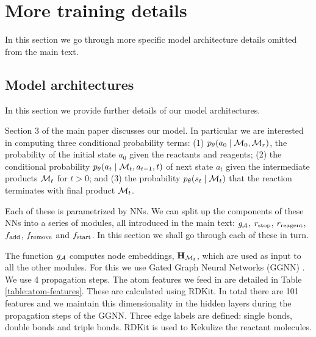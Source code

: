 \section{More training details}

In this section we go through more specific model architecture details omitted from the main text. 

\subsection{Model architectures}
In this section we provide further details of our model architectures.

Section 3 of the main paper discusses our model.
In particular we are interested in computing three conditional probability terms: (1) $p_\theta(a_0 \mid {\mathcal{M}}_0, {\mathcal{M}}_r)$, the probability of the initial state $a_0$ given the reactants and reagents; 
(2) the conditional probability $p_\theta(a_t \mid {\mathcal{M}}_t, a_{t-1}, t)$  
of next state $a_t$ given the intermediate products ${\mathcal{M}}_t$ for $t > 0$;
and (3) the probability $p_\theta(s_t \mid {\mathcal{M}}_t)$ that the reaction terminates with final product ${\mathcal{M}}_{t}$.

Each of these is parametrized by NNs. We can split up the components of these NNs into a series of modules, all introduced in the main text: $g_{{\mathcal{A}}}$, $r_{\textrm{stop}}$, $r_\mathrm{reagent}$, $f_{\textrm{add}}$, $f_{\textrm{remove}}$ and $f_{\textrm{start}}$.
 In this section we shall go through each of these in turn.

The function $g_{{\mathcal{A}}}$ computes node embeddings, ${\mathbf{H}}_{{\mathcal{M}}_t}$, which are used as input to all the other modules. For this we use Gated Graph Neural Networks (GGNN) \citep{li2016gated, gilmer2017neural}.
 We use 4 propagation steps. 
 The atom features we feed in are detailed in Table \ref{table:atom-features}. These are calculated using RDKit. In total there are 101 features and we maintain this dimensionality in the hidden layers during the propagation steps of the GGNN. Three edge labels are defined: single bonds, double bonds and triple bonds. RDKit is used to Kekulize the reactant molecules. 

